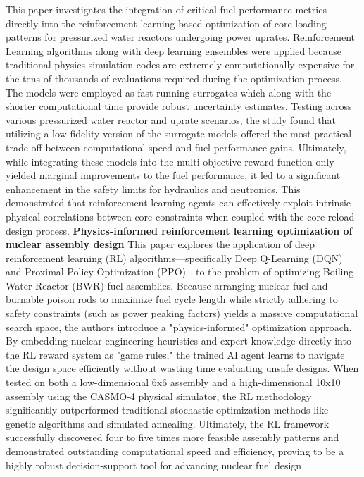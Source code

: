 \documentclass{article}
\begin{document}
\newline
This paper investigates the integration of critical fuel performance metrics directly into the reinforcement learning-based optimization of core loading patterns for pressurized water reactors undergoing power uprates. Reinforcement Learning algorithms along with deep learning ensembles were applied because traditional physics simulation codes are extremely computationally expensive for the tens of thousands of evaluations required during the optimization process.  The models were employed as fast-running surrogates which along with the shorter computational time provide robust uncertainty estimates. Testing across various pressurized water reactor and uprate scenarios, the study found that utilizing a low fidelity version of the surrogate models offered the most practical trade-off between computational speed and fuel performance gains. Ultimately, while integrating these models into the multi-objective reward function only yielded marginal improvements to the fuel performance, it led to a significant enhancement in the safety limits for hydraulics and neutronics. This demonstrated that reinforcement learning agents can effectively exploit intrinsic physical correlations between core constraints when coupled with the core reload design process. 
\newline
\textbf{Physics-informed reinforcement learning optimization of nuclear assembly design}
\newline
This paper explores the application of deep reinforcement learning (RL) algorithms—specifically Deep Q-Learning (DQN) and Proximal Policy Optimization (PPO)—to the problem of optimizing Boiling Water Reactor (BWR) fuel assemblies. Because arranging nuclear fuel and burnable poison rods to maximize fuel cycle length while strictly adhering to safety constraints (such as power peaking factors) yields a massive computational search space, the authors introduce a "physics-informed" optimization approach. By embedding nuclear engineering heuristics and expert knowledge directly into the RL reward system as "game rules," the trained AI agent learns to navigate the design space efficiently without wasting time evaluating unsafe designs. When tested on both a low-dimensional 6x6 assembly and a high-dimensional 10x10 assembly using the CASMO-4 physical simulator, the RL methodology significantly outperformed traditional stochastic optimization methods like genetic algorithms and simulated annealing. Ultimately, the RL framework successfully discovered four to five times more feasible assembly patterns and demonstrated outstanding computational speed and efficiency, proving to be a highly robust decision-support tool for advancing nuclear fuel design
\end{document}
